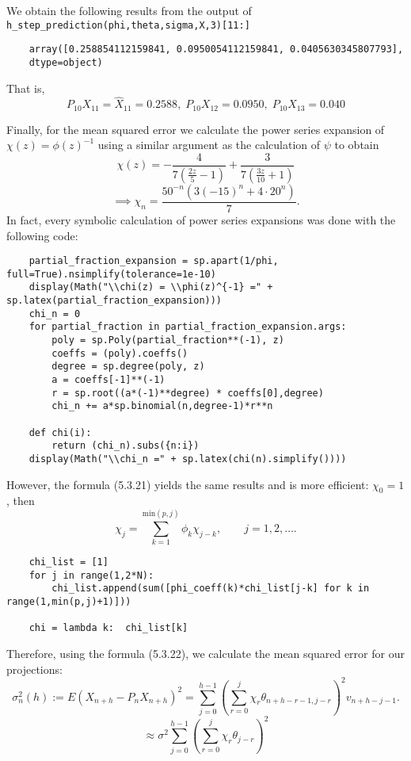 We obtain the following results from the output of \texttt{h_step_prediction(phi,theta,sigma,X,3)[11:]}
\begin{verbatim}
    array([0.258854112159841, 0.0950054112159841, 0.0405630345807793],
    dtype=object)
\end{verbatim}
That is,
\[ P_{10}X_{11} = \hat{X}_{11} =0.2588,\; P_{10}X_{12} = 0.0950,\; P_{10}X_{13} = 0.040 \]

Finally, for the mean squared error we calculate the power series expansion of $\chi(z)= \phi(z)^{-1}$ using a similar argument as the calculation of $\psi$ to obtain
\[ \chi(z) = - \frac{4}{7 \left(\frac{2 z}{5} - 1\right)} + \frac{3}{7 \left(\frac{3 z}{10} + 1\right)}
\]
\[\implies  \chi_n = \frac{50^{- n} \left(3 \left(-15\right)^{n} + 4 \cdot 20^{n}\right)}{7}. \]
In fact, every symbolic calculation of power series expansions was done with the following code:
\begin{verbatim}
    partial_fraction_expansion = sp.apart(1/phi, full=True).nsimplify(tolerance=1e-10)
    display(Math("\\chi(z) = \\phi(z)^{-1} =" + sp.latex(partial_fraction_expansion)))
    chi_n = 0
    for partial_fraction in partial_fraction_expansion.args:
        poly = sp.Poly(partial_fraction**(-1), z)
        coeffs = (poly).coeffs()
        degree = sp.degree(poly, z)
        a = coeffs[-1]**(-1)
        r = sp.root((a*(-1)**degree) * coeffs[0],degree)
        chi_n += a*sp.binomial(n,degree-1)*r**n

    def chi(i):
        return (chi_n).subs({n:i})
    display(Math("\\chi_n =" + sp.latex(chi(n).simplify())))
\end{verbatim}

However, the formula (5.3.21) yields the same results and is more efficient: $\chi_0 = 1$, then
\[ \chi_{j}=\sum^{\mathrm{min}(p,j)}_{{k=1}}\phi_{k}\chi_{j-k},\qquad j=1,2,\ldots. \]
\begin{verbatim}
    chi_list = [1]
    for j in range(1,2*N):
        chi_list.append(sum([phi_coeff(k)*chi_list[j-k] for k in range(1,min(p,j)+1)]))

    chi = lambda k:  chi_list[k]
\end{verbatim}


Therefore, using the formula (5.3.22), we calculate the mean squared error for our projections:
\[ \sigma_{n}^{2}(h):=E(X_{n+h}-P_{n}X_{n+h})^{2}=\sum_{j=0}^{h-1}\left(\sum_{r=0}^{j}\chi_{r}\theta_{n+h-r-1,j-r}\right)^{2}v_{n+h-j-1}. \]
\[ \approx \sigma^2 \sum_{j = 0}^{h-1} \left( \sum_{r = 0}^{j} \chi_r \theta_{j-r} \right)^2 \]

